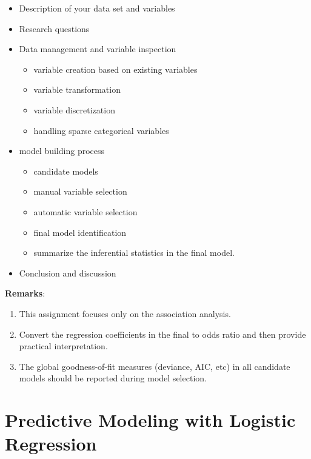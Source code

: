 \documentclass[
]{book}
\begin{document}
\begin{itemize}
\item
  Description of your data set and variables
\item
  Research questions
\item
  Data management and variable inspection

  \begin{itemize}
  \item
    variable creation based on existing variables
  \item
    variable transformation
  \item
    variable discretization
  \item
    handling sparse categorical variables
  \end{itemize}
\item
  model building process

  \begin{itemize}
  \item
    candidate models
  \item
    manual variable selection
  \item
    automatic variable selection
  \item
    final model identification
  \item
    summarize the inferential statistics in the final model.
  \end{itemize}
\item
  Conclusion and discussion
\end{itemize}

\textbf{Remarks}:

\begin{enumerate}
\def\labelenumi{\arabic{enumi}.}
\item
  This assignment focuses only on the association analysis.
\item
  Convert the regression coefficients in the final to odds ratio and then provide practical interpretation.
\item
  The global goodness-of-fit measures (deviance, AIC, etc) in all candidate models should be reported during model selection.
\end{enumerate}

\hypertarget{predictive-modeling-with-logistic-regression}{%
\chapter{Predictive Modeling with Logistic Regression}\label{predictive-modeling-with-logistic-regression}}
\end{document}
